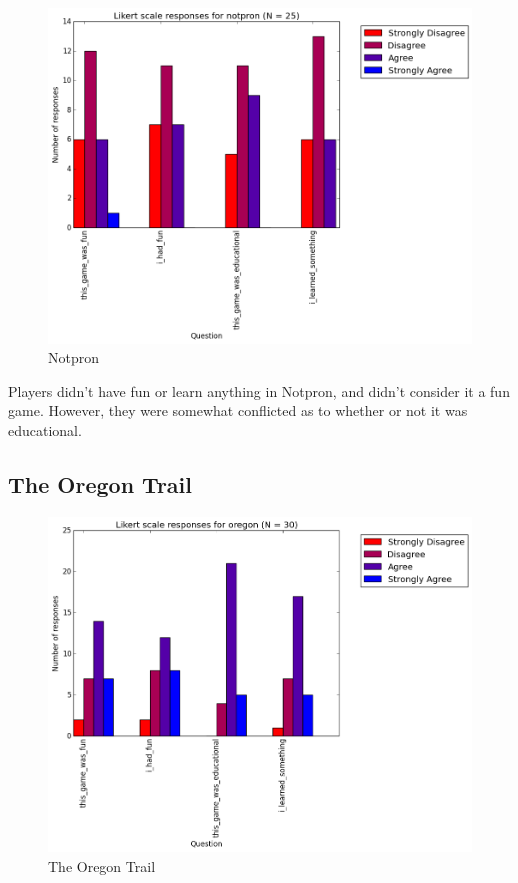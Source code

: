 				\begin{figure}[] 
				\centering 
				\includegraphics[width=\textwidth, height=.4\textheight, keepaspectratio=true]{notpron_likert.png} 
				\caption{Notpron}
				\end{figure}

				Players didn't have fun or learn anything in Notpron, and didn't consider it a fun game. However, they were somewhat conflicted as to whether or not it was educational.

			\subsection{The Oregon Trail}

				\begin{figure}[] 
				\centering 
				\includegraphics[width=\textwidth, height=.4\textheight, keepaspectratio=true]{oregon_likert.png} 
				\caption{The Oregon Trail}
				\end{figure}

